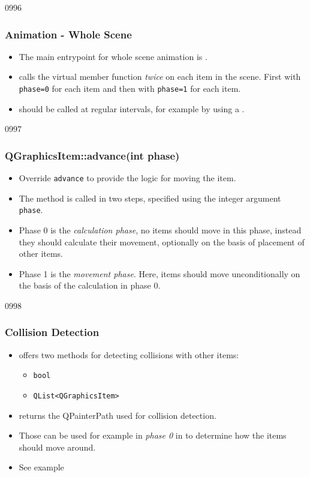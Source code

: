 \begin{slide}{0996}\frametitle{Animation - Whole Scene}
\begin{itemize}
\item The main entrypoint for whole scene animation is .
\item {} calls the virtual member function 
 \emph{twice} on each item in the scene. First
with \texttt{phase=0} for each item and then with \texttt{phase=1} for each item.
\item {} should be called at regular intervals, for example by using a .
\end{itemize}
\end{slide}

\begin{slide}{0997}\frametitle{QGraphicsItem::advance(int phase)}
\begin{itemize}
\item Override \texttt{advance} to provide the logic for moving the item.
\item The method is called in two steps, specified using the integer
  argument \texttt{phase}.
\item Phase 0 is the \emph{calculation phase}, no items should move in this
  phase, instead they should calculate their movement, optionally on the basis of
  placement of other items.
\item Phase 1 is the \emph{movement phase}. Here, items should move
  unconditionally on the basis of the calculation in phase 0.
\end{itemize}
\end{slide}

\begin{slide}{0998}\frametitle{Collision Detection}
\begin{itemize}
\item {} offers two methods for detecting collisions with other items:
{\footnotesize
\begin{itemize}
\item \texttt{bool} 
\item \texttt{QList<QGraphicsItem\pointerStar{}>} 
\end{itemize}
}
\item {} returns the QPainterPath used for collision detection.
\item Those can be used for example in \emph{phase 0} in  to determine how the items should move around.
\item See example 
\end{itemize}
\end{slide}
